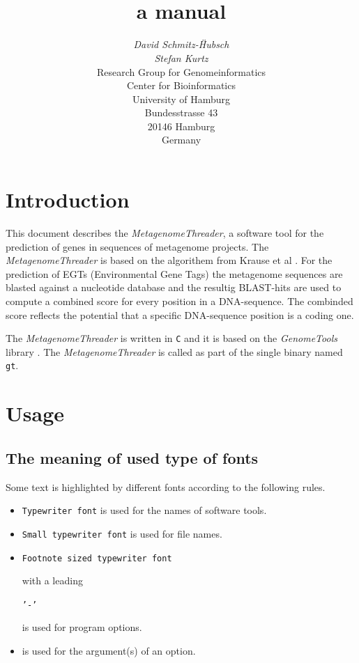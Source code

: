 \documentclass[12pt,titlepage]{article}
\title{\MetagenomeThreader\\
a manual}
\author{\begin{tabular}{c}
         \textit{David Schmitz-H{\"}ubsch}\\
         \textit{Stefan Kurtz}\\[1cm]
         Research Group for Genomeinformatics\\
         Center for Bioinformatics\\
         University of Hamburg\\
         Bundesstrasse 43\\
         20146 Hamburg\\
         Germany\\[1cm]
        \end{tabular}}
\newcommand{\MetagenomeThreader}{\textit{MetagenomeThreader}\xspace}
\newcommand{\GenomeTools}{\textit{GenomeTools}\xspace}
\newcommand{\Gt}{\texttt{gt}\xspace}
\begin{document}
\maketitle

\section{Introduction} \label{Introduction}

This document describes the \MetagenomeThreader, a software tool
for the prediction of genes in sequences of metagenome projects.
The \MetagenomeThreader is based on the algorithem from Krause et al \cite{krause}.
For the prediction of EGTs (Environmental Gene Tags) the metagenome sequences are
blasted against a nucleotide database and the resultig BLAST-hits are used to
compute a combined score for every position in a DNA-sequence. The combinded score
reflects the potential that a specific DNA-sequence position is a coding one.

The \MetagenomeThreader is written in \texttt{C} and it is based 
on the \GenomeTools library \cite{genometools}. The \MetagenomeThreader is called
as part of the single binary named \Gt.

\section{Usage} \label{Usage}

\subsection{The meaning of used type of fonts} \label{Fonts}
Some text is highlighted by different fonts according to the following rules.

\begin{itemize}
\item \texttt{Typewriter font} is used for the names of software tools.
\item \texttt{\small{Small typewriter font}} is used for file names.
\item \begin{footnotesize}\texttt{Footnote sized typewriter font}
      \end{footnotesize} with a leading 
      \begin{footnotesize}\texttt{'-'}\end{footnotesize} 
      is used for program options.
\item {} is used for the argument(s) of an
      option.
\end{itemize}
\end{document}
